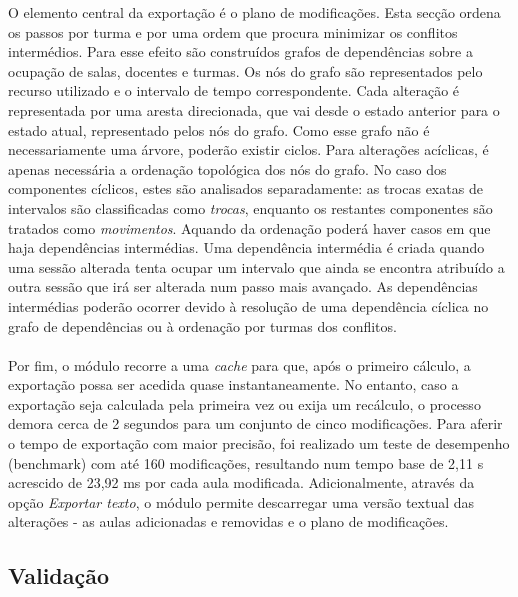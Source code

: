 \documentclass[10pt]{article}
\begin{document}
    O elemento central da exportação é o plano de modificações. Esta secção ordena os passos por turma e por uma ordem que procura minimizar os conflitos intermédios. Para esse efeito são construídos grafos de dependências sobre a ocupação de salas, docentes e turmas. Os nós do grafo são representados pelo recurso utilizado e o intervalo de tempo correspondente. Cada alteração é representada por uma aresta direcionada, que vai desde o estado anterior para o estado atual, representado pelos nós do grafo. Como esse grafo não é necessariamente uma árvore, poderão existir ciclos. Para alterações acíclicas, é apenas necessária a ordenação topológica dos nós do grafo. No caso dos componentes cíclicos, estes são analisados separadamente: as trocas exatas de intervalos são classificadas como \emph{trocas}, enquanto os restantes componentes são tratados como \emph{movimentos}. Aquando da ordenação poderá haver casos em que haja dependências intermédias. Uma dependência intermédia é criada quando uma sessão alterada tenta ocupar um intervalo que ainda se encontra atribuído a outra sessão que irá ser alterada num passo mais avançado. As dependências intermédias poderão ocorrer devido à resolução de uma dependência cíclica no grafo de dependências ou à ordenação por turmas dos conflitos.
    \\\\
    Por fim, o módulo recorre a uma \emph{cache} para que, após o primeiro cálculo, a exportação possa ser acedida quase instantaneamente. No entanto, caso a exportação seja calculada pela primeira vez ou exija um recálculo, o processo demora cerca de 2 segundos para um conjunto de cinco modificações. Para aferir o tempo de exportação com maior precisão, foi realizado um teste de desempenho (benchmark) com até 160 modificações, resultando num tempo base de 2,11 s acrescido de 23,92 ms por cada aula modificada. Adicionalmente, através da opção \emph{Exportar texto}, o módulo permite descarregar uma versão textual das alterações - as aulas adicionadas e removidas e o plano de modificações.


\subsection{Validação}
\end{document}
